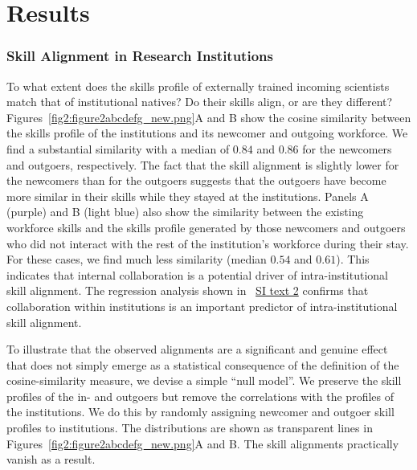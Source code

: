 \documentclass[draft,final]{vutinfth} %
\begin{document}
\section{Results}
\subsubsection{Skill Alignment in Research Institutions}
To what extent does the skills profile of externally trained incoming scientists match that of institutional natives? Do their skills align, or are they different? Figures~\ref{fig2:figure2abcdefg_new.png}A and B show the cosine similarity between the skills profile of the institutions and its newcomer and outgoing workforce. We find a substantial similarity with a median of $0.84$ and $0.86$ for the newcomers and outgoers, respectively. The fact that the skill alignment is slightly lower for the newcomers than for the outgoers suggests that the outgoers have become more similar in their skills while they stayed at the institutions. Panels A (purple) and B (light blue) also show the similarity between the existing workforce skills and the skills profile generated by those newcomers and outgoers who did not interact with the rest of the institution's workforce during their stay. For these cases, we find much less similarity (median $0.54$ and $0.61$). This indicates that internal collaboration is a potential driver of intra-institutional skill alignment. The regression analysis shown in ~\hyperref[SI4]{SI text 2} confirms that collaboration within institutions is an important predictor of intra-institutional skill alignment.

To illustrate that the observed alignments are a significant and genuine effect that does not simply emerge as a statistical consequence of the definition of the cosine-similarity measure, we devise a simple ``null model''. We preserve the skill profiles of the in- and outgoers but remove the correlations with the profiles of the institutions. We do this by randomly assigning newcomer and outgoer skill profiles to institutions. The distributions are shown as transparent lines in Figures~\ref{fig2:figure2abcdefg_new.png}A and B. The skill alignments practically vanish as a result. 
\end{document}
